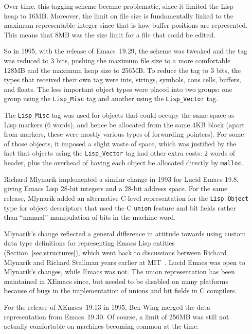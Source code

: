 \documentclass[format=acmsmall,screen]{acmart}
\newcommand \Elisp {Emacs Lisp}
\begin{document}
Over time, this tagging scheme became problematic, since it limited the Lisp
heap to 16\;MB.
Moreover, the limit on file size is fundamentally linked to the maximum representable
integer since that is how buffer positions are represented.
This means that 8\;MB was the size limit for a file that could be edited.

So in 1995, with the release of Emacs~19.29,
the scheme was tweaked and the tag was reduced to
3 bits, pushing the maximum file size to a more comfortable 128\;MB and the
maximum heap size to 256\;MB.  To reduce the tag to 3 bits,
the types that received their own tag were ints, strings, symbols, cons
cells, buffers, and floats.
The less important
object types were placed into two groups: one group using the
\texttt{Lisp\_Misc} tag and another using the \texttt{Lisp\_Vector}
tag.

The \texttt{Lisp\_Misc} tag was used for objects that could occupy
the same space as Lisp markers (6 words), and hence be allocated from the same
4KB block (apart from markers, these were mostly various types of
forwarding pointers).  For some of those objects, it imposed a slight waste of space,
which was justified by the fact that objects using the \texttt{Lisp\_Vector}
tag had other extra costs: 2 words of header, plus the overhead of having
each object be allocated directly by \texttt{malloc}.

Richard Mlynarik implemented a similar change in 1993 for Lucid Emacs
19.8, giving \Elisp{} 28-bit integers and a 28-bit address space.  For
the same release, Mlynarik added an alternative C-level representation for the
\texttt{Lisp\_Object} type for object descriptors that used
the C \texttt{union} feature and bit fields rather than ``manual''
manipulation of bits in the machine word.

Mlynarik's change reflected a general difference in attitude towards using
custom data type definitions for representing \Elisp{} entities
(Section~\ref{sec:structures}), which
went back to discussions between Richard Mlynarik and Richard Stallman
years earlier at MIT~\cite{Mlynarik-personal}.  Lucid Emacs was open
to Mlynarik's changes, while Emacs was not.
The union representation has been maintained in XEmacs since, but needed to be
disabled on many platforms because of bugs in the implementation of
unions and bit fields in C compilers.

For the release of XEmacs~19.13 in 1995, Ben Wing merged the data
representation from Emacs~19.30.
Of course, a limit of 256\;MB was still not actually comfortable on
machines becoming common at the time.
\end{document}

